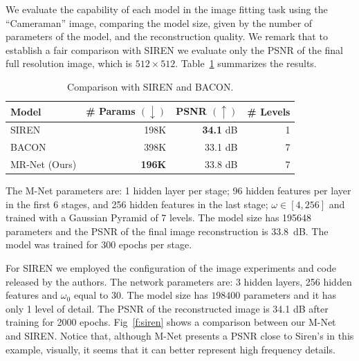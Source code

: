 We evaluate the capability of each model in the image fitting task using the ``Cameraman'' image, comparing the model size, given by the number of parameters of the model, and the reconstruction quality. We remark that to establish a fair comparison with SIREN we evaluate only the PSNR of the final full resolution image, which is $512\times 512$. Table~\ref{t:comp} summarizes the results.

\begin{table}[!h]
\centering
\small
\begin{tabular}{|l|r|r|r|}
\hline
Model & \# Params $(\downarrow)$ & PSNR $(\uparrow)$ & \# Levels \\
\hline
SIREN~\cite{sitzmann2019siren} & 198K & {\bf 34.1} dB & 1  \\
BACON~\cite{bacon2021} & 398K & 33.1 dB & 7 \\
MR-Net (Ours) & {\bf 196K} & 33.8 dB & 7  \\
\hline
\end{tabular}
\vspace{-0.1cm}
\caption{\label{tab:comp} Comparison with SIREN and BACON.}
\label{t:comp}
\end{table}

The M-Net parameters are: 1 hidden layer per stage; 96 hidden features per layer in the first 6 stages, and 256 hidden features in the last stage; $\omega \in [4, 256]$ and trained with a Gaussian Pyramid of 7 levels. The model size has 195648 parameters and the PSNR of the final image reconstruction is 33.8~dB. The model was trained for 300 epochs per stage.

For SIREN we employed the configuration of the image experiments and code released by the authors. The network parameters are: 3 hidden layers, 256 hidden features and $\omega_0$ equal to 30. The model size has $198400$ parameters and it has only 1 level of detail. The PSNR of the reconstructed image is 34.1 dB after training for 2000 epochs. Fig~\ref{f:siren} shows a comparison between our M-Net and SIREN. Notice that, although M-Net presents a PSNR close to Siren's in this example, visually, it seems that it can better represent high frequency details.

